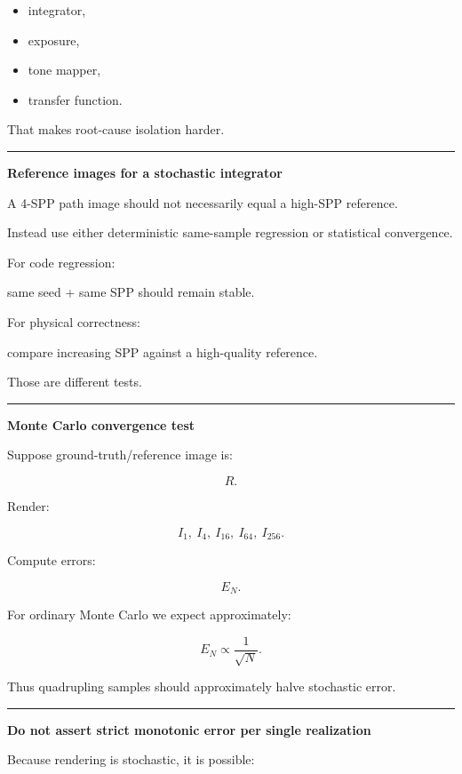 \begin{itemize}
\tightlist
\item
  integrator,
\item
  exposure,
\item
  tone mapper,
\item
  transfer function.
\end{itemize}

That makes root-cause isolation harder.

\begin{center}\rule{0.5\linewidth}{0.5pt}\end{center}

\textbf{Reference images for a stochastic integrator}

A 4-SPP path image should not necessarily equal a high-SPP reference.

Instead use either deterministic same-sample regression or statistical convergence.

For code regression:

same seed + same SPP should remain stable.

For physical correctness:

compare increasing SPP against a high-quality reference.

Those are different tests.

\begin{center}\rule{0.5\linewidth}{0.5pt}\end{center}

\textbf{Monte Carlo convergence test}

Suppose ground-truth/reference image is:

\[
R.
\]

Render:

\[
I_1,\ I_4,\ I_{16},\ I_{64},\ I_{256}.
\]

Compute errors:

\[
E_N.
\]

For ordinary Monte Carlo we expect approximately:

\[
\boxed{
E_N
\propto
\frac1{\sqrt N}.
}
\]

Thus quadrupling samples should approximately halve stochastic error.

\begin{center}\rule{0.5\linewidth}{0.5pt}\end{center}

\textbf{Do not assert strict monotonic error per single realization}

Because rendering is stochastic, it is possible:


